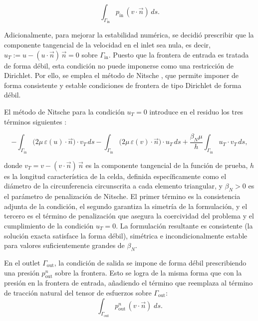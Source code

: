 \documentclass[12pt, letterpaper]{article}
\begin{document}
\begin{equation}
  \label{eq:inlet_pressure_bc}
  \int_{\Gamma_\mathrm{in}} p_\mathrm{in} \, (v \cdot \vec{n}) \, ds.
\end{equation}

Adicionalmente, para mejorar la estabilidad numérica, se decidió prescribir que la componente tangencial de la velocidad en el inlet sea nula, es decir, $u_T := u - (u \cdot \vec{n})\,\vec{n} = 0$ sobre $\Gamma_\mathrm{in}$. Puesto que la frontera de entrada es tratada de forma débil, esta condición no puede imponerse como una restricción de Dirichlet. Por ello, se emplea el método de Nitsche \cite{nitsche_original}, que permite imponer de forma consistente y estable condiciones de frontera de tipo Dirichlet de forma débil.

El método de Nitsche para la condición $u_T = 0$ introduce en el residuo los tres términos siguientes \cite{nitsche_ns}:

\begin{equation}
  \label{eq:nitsche_inlet}
  -\int_{\Gamma_\mathrm{in}} \bigl(2\mu\,\varepsilon(u)\cdot \vec{n}\bigr) \cdot v_T \, ds
  -\int_{\Gamma_\mathrm{in}} \bigl(2\mu\,\varepsilon(v)\cdot \vec{n}\bigr) \cdot u_T \, ds
  +\frac{\beta_N \mu}{h} \int_{\Gamma_\mathrm{in}} u_T \cdot v_T \, ds,
\end{equation}

\noindent donde $v_T = v - (v \cdot \vec{n})\,\vec{n}$ es la componente tangencial de la función de prueba, $h$ es la longitud característica de la celda, definida específicamente como el diámetro de la circunferencia circunscrita a cada elemento triangular, y $\beta_N > 0$ es el parámetro de penalización de Nitsche. El primer término es la consistencia adjunta de la condición, el segundo garantiza la simetría de la formulación, y el tercero es el término de penalización que asegura la coercividad del problema y el cumplimiento de la condición $u_T = 0$. La formulación resultante es consistente (la solución exacta satisface la forma débil), simétrica e incondicionalmente estable para valores suficientemente grandes de $\beta_N$.

En el outlet $\Gamma_\mathrm{out}$, la condición de salida se impone de forma débil prescribiendo una presión $p_{\mathrm{out}}^n$ sobre la frontera. Esto se logra de la misma forma que con la presión en la frontera de entrada, añadiendo el término que reemplaza al término de tracción natural del tensor de esfuerzos sobre $\Gamma_\mathrm{out}$:
\begin{equation}
  \label{eq:outlet_pressure_weak}
  \int_{\Gamma_\mathrm{out}} p_{\mathrm{out}}^n \, (v \cdot \vec{n}) \; ds.
\end{equation}
\end{document}
